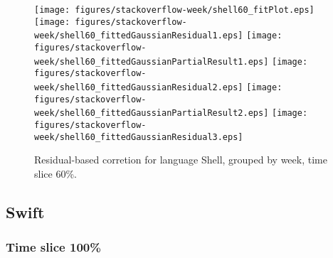 \begin{figure}[hb]
\centering
{}
{\texttt{[image: figures/stackoverflow-week/shell60\_fitPlot.eps]}}
{\texttt{[image: figures/stackoverflow-week/shell60\_fittedGaussianResidual1.eps]}}
{\texttt{[image: figures/stackoverflow-week/shell60\_fittedGaussianPartialResult1.eps]}}
{\texttt{[image: figures/stackoverflow-week/shell60\_fittedGaussianResidual2.eps]}}
{\texttt{[image: figures/stackoverflow-week/shell60\_fittedGaussianPartialResult2.eps]}}
{\texttt{[image: figures/stackoverflow-week/shell60\_fittedGaussianResidual3.eps]}}
\caption{Residual-based corretion for language Shell, grouped by week, time slice 60\%.}
\end{figure}


\clearpage 
\newpage 


\subsection{Swift}

\FloatBarrier

\subsubsection{Time slice 100\%}

